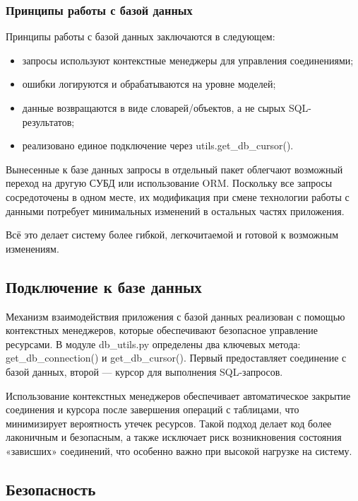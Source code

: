 \subsubsection{Принципы работы с базой данных}

Принципы работы с базой данных заключаются в следующем:

\begin{itemize}
	\item запросы используют контекстные менеджеры для управления соединениями;
	\item ошибки логируются и обрабатываются на уровне моделей;
	\item данные возвращаются в виде словарей/объектов, а не сырых SQL-результатов;
	\item реализовано единое подключение через utils.get\_db\_cursor().
\end{itemize}

Вынесенные к базе данных запросы в отдельный пакет облегчают возможный переход на другую СУБД или использование ORM. Поскольку все запросы сосредоточены в одном месте, их модификация при смене технологии работы с данными потребует минимальных изменений в остальных частях приложения.

Всё это делает систему более гибкой, легкочитаемой и готовой к возможным изменениям.

\subsection{Подключение к базе данных}

Механизм взаимодействия приложения с базой данных реализован с помощью контекстных менеджеров, которые обеспечивают безопасное управление ресурсами. В модуле db\_utils.py определены два ключевых метода: get\_db\_connection() и get\_db\_cursor(). Первый предоставляет соединение с базой данных, второй — курсор для выполнения SQL-запросов.

Использование контекстных менеджеров обеспечивает автоматическое закрытие соединения и курсора после завершения операций с таблицами, что минимизирует вероятность утечек ресурсов. Такой подход делает код более лаконичным и безопасным, а также исключает риск возникновения состояния «зависших» соединений, что особенно важно при высокой нагрузке на систему.

\subsection{Безопасность}

